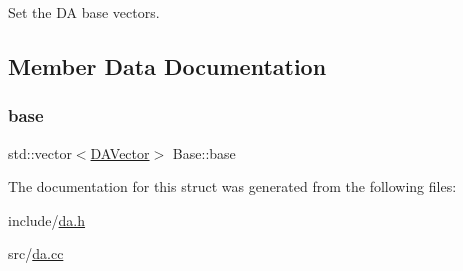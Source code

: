 Set the DA base vectors. 



\subsection{Member Data Documentation}
\mbox{\label{struct_base_adb3cdc5b0035be7540ea8e0b0450c637}} 
\subsubsection{\texorpdfstring{base}{base}}
{\footnotesize\ttfamily std\+::vector$<$\mbox{\hyperlink{struct_d_a_vector}{D\+A\+Vector}}$>$ Base\+::base}



The documentation for this struct was generated from the following files\+:\begin{DoxyCompactItemize}
\item 
include/\mbox{\hyperlink{da_8h}{da.\+h}}\item 
src/\mbox{\hyperlink{da_8cc}{da.\+cc}}\end{DoxyCompactItemize}
